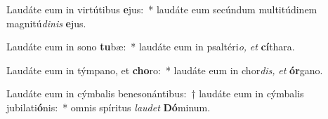 \item Laudáte eum in virtútibus \textbf{e}jus:~* laudáte eum secúndum multitúdinem magnitú\textit{dinis} \textbf{e}jus.
\item Laudáte eum in sono \textbf{tu}bæ:~* laudáte eum in psaltéri\textit{o,} \textit{et} \textbf{cí}thara.
\item Laudáte eum in týmpano, et \textbf{cho}ro:~* laudáte eum in chor\textit{dis,} \textit{et} \textbf{ór}gano.
\item Laudáte eum in cýmbalis benesonántibus:~† laudáte eum in cýmbalis jubilati\textbf{ó}nis:~* omnis spíritus \textit{laudet} \textbf{Dó}minum.
